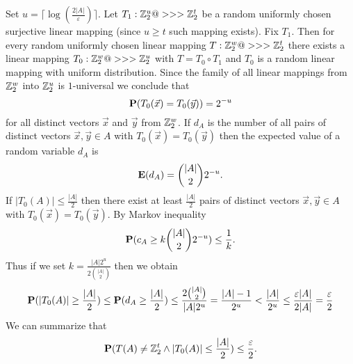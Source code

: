 Set $u=\lceil\log(\frac {2|A|}{\varepsilon})\rceil$. Let $
T_1:\Bbb Z_2^u@>>>\Bbb Z_2^t$ be a random 
uniformly chosen surjective linear mapping (since $u\ge t$ such 
mapping exists). Fix $T_1$. Then 
for every random uniformly chosen linear mapping $T:\Bbb Z_2^w@>>>
\Bbb Z_2^t$ 
there exists a linear mapping $T_0:\Bbb Z_2^w@>>>\Bbb Z_2^u$ with $
T=T_0\circ T_1$ 
and $T_0$ is a random linear mapping with uniform distribution. 
Since the family of all linear mappings from $\Bbb Z_2^w$ into $\Bbb Z^
u_2$ is 
$1$-universal we conclude that 
$$\bold P(T_0(\vec {x})=T_0(\vec {y}))=2^{-u}$$
for all distinct vectors $\vec {x}$ and $\vec {y}$ from $\Bbb Z^w_
2$. If $d_A$ is the number of 
all pairs of distinct vectors $\vec {x},\vec {y}\in A$ with $T_0(
\vec {x})=T_0(\vec {y})$ then 
the expected value of a random variable $d_A$ is
$$\bold E(d_A)=\binom {|A|}22^{-u}.$$
If $|T_0(A)|\le\frac {|A|}2$ then there exist at least $\frac {|A
|}2$ pairs of distinct 
vectors $\vec {x},\vec {y}\in A$ with $T_0(\vec {x})=T_0(\vec {y}
)$. By Markov inequality 
$$\bold P(c_A\ge k\binom {|A|}22^{-u})\le\frac 1k.$$
Thus if we set $k=\frac {|A|2^u}{2\binom {|A|}2}$ then we obtain  
$$\bold P(|T_0(A)|\ge\frac {|A|}2)\le \bold P(d_A\ge\frac {|A|}2)
\le\frac {2\binom {|A|}2}{|A|2^u}=\frac {|A|-1}{2^u}<\frac {|A|}{
2^u}\le\frac {\varepsilon |A|}{2|A|}=\frac {\varepsilon}2$$
We can summarize that
$$\bold P(T(A)\ne \Bbb Z^t_2\wedge |T_0(A)|\le\frac {|A|}2)\le\frac {
\varepsilon}2.$$

